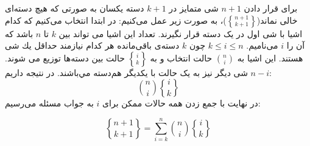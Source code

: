 \p
برای قرار دادن
$n+1$
شی متمایز در
$k+1$
دسته یکسان به صورتی که هیچ دسته‌ای خالی نماند($\genfrac{\{}{\}}{0pt}{}{n + 1}{k + 1}$)، به صورت زیر عمل می‌کنیم:
در ابتدا انتخاب می‌کنیم که کدام اشیا با شی اول در یک دسته قرار نگیرند.
تعداد این اشیا می تواند بین
$k$ تا $n$ 
 باشد
 که آن را $i$ می‌نامیم.
 $k \leq i \leq n$
چون
$k$
دسته‌ی باقی‌مانده هر کدام نیازمند حداقل يك شی هستند.
   این اشیا به
${n\choose i}$ 
حالت انتخاب 
و به 
$\genfrac{\{}{\}}{0pt}{}{i}{k}$
حالت بین دسته‌ها توزیع می شوند.
$n-i$ 
شی دیگر نیز به یک حالت با یکدیگر هم‌دسته مي‌باشند. در نتیجه داریم:
$${n\choose i} \genfrac{\{}{\}}{0pt}{}{i}{k}$$
\p
در نهایت با جمع زدن همه حالات ممکن برای $i$ به جواب مسئله می‌رسیم:

$$\genfrac{\{}{\}}{0pt}{}{n + 1}{k + 1} = \sum\limits_{i=k}^{n} {n\choose i} \genfrac{\{}{\}}{0pt}{}{i}{k}$$




